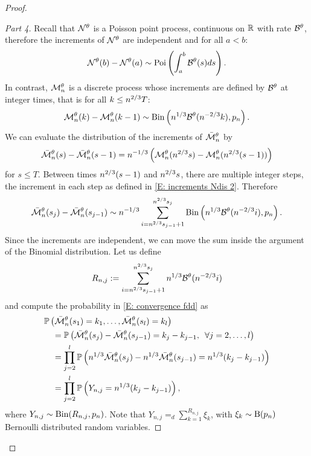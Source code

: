 \begin{proof}
\begin{proof}[Part 4]
Recall that $\mathcal{N}^{\theta}$ is a Poisson point process, continuous on $\mathbb{R}$ with rate $\mathcal{B}^{\theta}$,
therefore the increments of $\mathcal{N}^{\theta}$ are independent and for all $a<b$: 
\begin{equation*}
\mathcal{N}^{\theta}(b) - \mathcal{N}^{\theta}(a) \sim \operatorname*{Poi}\left( \int_{a}^{b} \mathcal{B}^{\theta}(s)ds\right).
\end{equation*}
In contrast, $\mathcal{M}_n^{\theta}$ is a discrete process whose increments are defined by $\mathcal{B}^{\theta}$ at integer times, 
that is for all $k \leq n^{2 / 3}T$: 
\begin{equation} \label{E: increments Ndis 2}
\mathcal{M}_n^{\theta}(k) - \mathcal{M}_n^{\theta}(k-1) \sim \operatorname*{Bin}\left(n^{1 / 3}\mathcal{B}^{\theta}(n^{-2 / 3}k), p_n\right).
\end{equation}
We can evaluate the distribution of the increments of $\bar{\mathcal{M}}_n^{\theta}$ by
\begin{equation*}
\bar{\mathcal{M}}_n^{\theta}(s) - \bar{\mathcal{M}}_n^{\theta}(s-1) = n^{-1 / 3}\left( \mathcal{M}_n^{\theta}(n^{2 / 3}s) - \mathcal{M}_n^{\theta}(n^{2 / 3}(s-1))\right)
\end{equation*}
for $s \leq T$.
Between times $n^{2 / 3}(s-1)$ and $n^{2 / 3}s$, there are multiple integer steps,
the increment in each step as defined in \eqref{E: increments Ndis 2}. 
Therefore
\begin{equation*}
\bar{\mathcal{M}}_n^{\theta}(s_j) - \bar{\mathcal{M}}_n^{\theta}(s_{j-1}) \sim n^{-1 / 3} \sum_{i=n^{2 / 3}s_{j-1}+1}^{n^{2 / 3}s_j} \operatorname*{Bin}\left( n^{1 / 3}\mathcal{B}^{\theta}(n^{-2 / 3}i), p_n \right).
\end{equation*}
Since the increments are independent, we can move the sum inside the argument of the Binomial distribution.
Let us define 
\begin{equation*}
R_{n,j} := \sum_{i=n^{2 / 3}s_{j-1}+1}^{n^{2 / 3}s_j}n^{1 / 3}\mathcal{B}^{\theta}(n^{-2 / 3}i)
\end{equation*}
and compute the probability in \eqref{E: convergence fdd} as
\begin{equation} \label{E: distribution Ndis}
\begin{aligned}
&\mathbb{P}\left(\bar{\mathcal{M}}_n^{\theta}(s_1) = k_1, \dots, \bar{\mathcal{M}}_n^{\theta}(s_l) = k_l\right) \\
&\quad = \mathbb{P}\left( \bar{\mathcal{M}}_n^{\theta}(s_j) - \bar{\mathcal{M}}_n^{\theta}(s_{j-1}) = k_j - k_{j-1}, \enspace \forall j=2,\dots,l \right) \\
&\quad = \prod_{j=2}^{l} \mathbb{P}\left( n^{1 / 3}\bar{\mathcal{M}}_n^{\theta}(s_j) - n^{1 / 3}\bar{\mathcal{M}}_n^{\theta}(s_{j-1}) = n^{1 / 3}(k_j - k_{j-1})\right) \\
&\quad = \prod_{j=2}^{l} \mathbb{P}\left( Y_{n,j} = n^{1 / 3}(k_j - k_{j-1}) \right),
\end{aligned}
\end{equation}
where $Y_{n,j} \sim \operatorname*{Bin}(R_{n,j}, p_n)$.
Note that $Y_{n,j} =_d \sum_{k=1}^{R_{n,j}} \xi_k$, with $\xi_k \sim \operatorname*{B}(p_n)$ Bernoulli distributed random variables.


\end{proof}
\end{proof}
